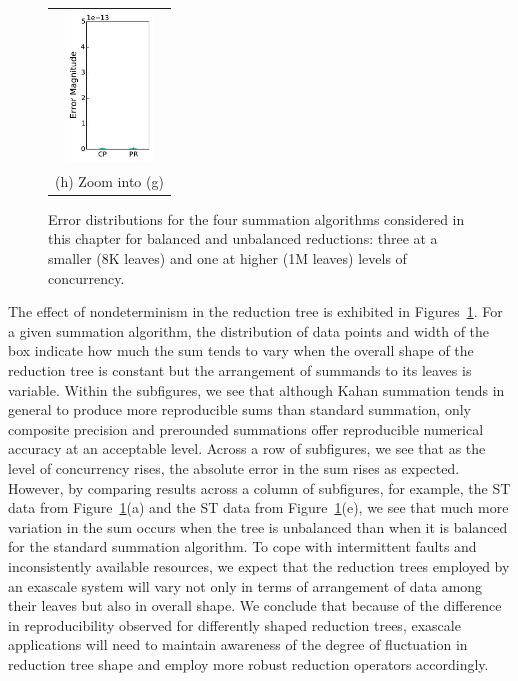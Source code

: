 \begin{figure}[!htb]
\begin{tabular}{c}
\includegraphics[width=\textwidth, height=4cm]{chapter_2_figures/draft_boxplot_unbalanced_cp_vs_preround_N=1048576.pdf} \\
(h) Zoom into (g)\\
\end{tabular}
\endminipage 
  \caption{Error distributions for the four summation algorithms
    considered in this chapter for balanced and unbalanced reductions:
    three at a smaller (8K leaves) and one at higher (1M leaves)
    levels of concurrency.}
\label{fig:boxplot}
\end{figure}

The effect of nondeterminism in the reduction tree is exhibited in
Figures~\ref{fig:boxplot}. For a given summation algorithm, the
distribution of data points and width of the box indicate how much the
sum tends to vary when the overall shape of the reduction tree is
constant but the arrangement of summands to its leaves is
variable. Within the subfigures, we see that although Kahan summation
tends in general to produce more reproducible sums than standard
summation, only composite precision and prerounded summations offer
reproducible numerical accuracy at an acceptable level.  Across a row
of subfigures, we see that as the level of concurrency rises, the
absolute error in the sum rises as expected. However, by comparing
results across a column of subfigures, for example, the ST data from
Figure~\ref{fig:boxplot}(a) and the ST data from
Figure~\ref{fig:boxplot}(e), we see that much more variation in the
sum occurs when the tree is unbalanced than when it is balanced for
the standard summation algorithm. To cope with intermittent faults and
inconsistently available resources, we expect that the reduction trees
employed by an exascale system will vary not only in terms of
arrangement of data among their leaves but also in overall shape. We
conclude that because of the difference in reproducibility observed
for differently shaped reduction trees, exascale applications will
need to maintain awareness of the degree of fluctuation in reduction
tree shape and employ more robust reduction operators accordingly.

